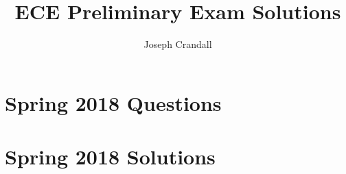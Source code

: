 
\usepackage{algorithm, algpseudocode, chemformula, color, gensymb, siunitx, soul, subfiles}
\usepackage[a4paper, total={7.5in, 10in}]{geometry}

\title{ECE Preliminary Exam Solutions}
\author{Joseph Crandall}


\maketitle

\section{Spring 2018 Questions}


\section{Spring 2018 Solutions}



